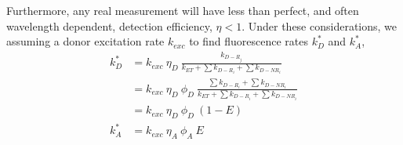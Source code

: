 \documentclass{article}
\begin{document}
Furthermore, any real measurement will have less than perfect, and
often wavelength dependent, detection efficiency, $\eta < 1$.  Under
these considerations, we assuming a donor excitation rate $k_{exc}$ to
find fluorescence rates $k^*_D$ and $k^*_A$,
\begin{align*}
  k^*_D & = k_{exc} ~ \eta_D ~ \frac{k_{D-R_j}}{k_{ET} + \sum k_{D-R_i} + \sum k_{D-NR_i}} \\
        & = k_{exc} ~ \eta_D ~ \phi_D ~
           \frac{\sum k_{D-R_i} + \sum k_{D-NR_i}}{k_{ET} + \sum k_{D-R_i} + \sum k_{D-NR_i}} \\
        & = k_{exc} ~ \eta_D ~ \phi_D ~ (1 - E) \\
  k^*_A & = k_{exc} ~ \eta_A ~ \phi_A ~ E \\
\end{align*}
\end{document}
